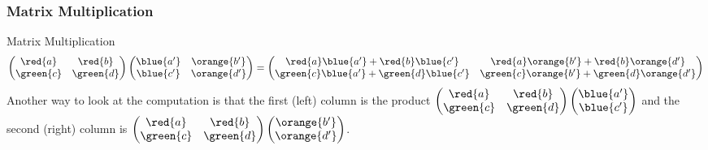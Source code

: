 \begin{frame}
\frametitle{Matrix Multiplication}
\begin{defn}{Matrix Multiplication}{}
\begin{equation}
\begin{pmatrix} \red{a} & \red{b} \\ \green{c} & \green{d} \end{pmatrix} \begin{pmatrix} \blue{a'} & \orange{b'} \\ \blue{c'} & \orange{d' }\end{pmatrix}= \begin{pmatrix} \red{a}\blue{a'} + \red{b}\blue{c'} & \red{a}\orange{b'} +\red{b}\orange{d'} \\ \green{c}\blue{a'} + \green{d}\blue{c'} & \green{c}\orange{b'} + \green{d}\orange{d' }\end{pmatrix}
\end{equation}
Another way to look at the computation is that the first (left) column is the product $\begin{pmatrix} \red{a} & \red{b} \\ \green{c} & \green{d} \end{pmatrix} \begin{pmatrix} \blue{a'} \\ \blue{c'}\end{pmatrix}$ and the second (right) column is $\begin{pmatrix} \red{a} & \red{b} \\ \green{c} & \green{d} \end{pmatrix} \begin{pmatrix}  \orange{b'} \\  \orange{d' }\end{pmatrix}$.
\end{defn}
\end{frame}


